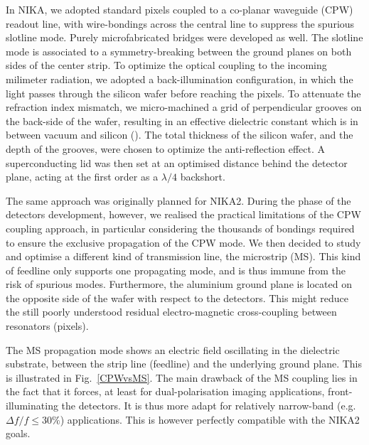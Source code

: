 \documentclass[]{aa} %
\begin{document}
In NIKA, we adopted standard pixels coupled to a co-planar waveguide (CPW) readout line, with wire-bondings across the central line to suppress the spurious slotline mode. Purely microfabricated bridges were developed as well. The slotline mode is associated to a symmetry-breaking between the ground planes on both sides of the center strip. To optimize the optical coupling to the incoming milimeter radiation, we adopted a back-illumination configuration, in which the light passes through the silicon wafer before reaching the pixels. To attenuate the refraction index mismatch, we micro-machined a grid of perpendicular grooves on the back-side of the wafer, resulting in an effective dielectric constant which is in between vacuum and silicon (\cite{Goupy2016}). The total thickness of the silicon wafer, and the depth of the grooves, were chosen to optimize the anti-reflection effect. A superconducting lid was then set at an optimised distance behind the detector plane, acting at the first order as a $\lambda/4$ backshort. 

The same approach was originally planned for NIKA2. During the phase of the detectors development, however, we realised the practical limitations of the CPW coupling approach, in particular considering the thousands of bondings required to ensure the exclusive propagation of the CPW mode. We then decided to study and optimise a different kind of transmission line, the microstrip (MS). This kind of feedline only supports one propagating mode, and is thus immune from the risk of spurious modes. Furthermore, the aluminium ground plane is located on the opposite side of the wafer with respect to the detectors. This might reduce the still poorly understood residual electro-magnetic cross-coupling between resonators (pixels).

The MS propagation mode shows an electric field oscillating in the dielectric substrate, between the strip line (feedline) and the underlying ground plane. This is illustrated in Fig.~\ref{CPWvsMS}. The main drawback of the MS coupling lies in the fact that it forces, at least for dual-polarisation imaging applications, front-illuminating the detectors. It is thus more adapt for relatively narrow-band (e.g. $\Delta f / f  \leq 30 \%$) applications. This is however perfectly compatible with the NIKA2 goals.  
\end{document}
